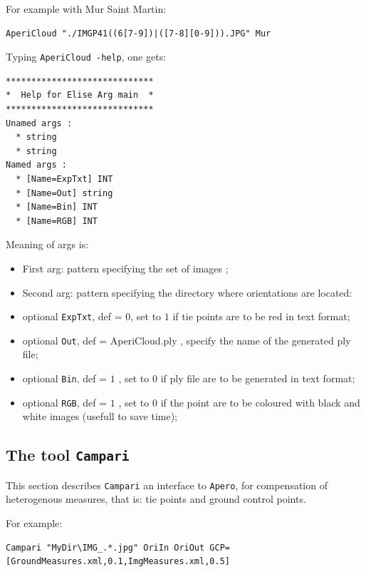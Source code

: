 For example with Mur Saint Martin:

\begin{verbatim}
AperiCloud "./IMGP41((6[7-9])|([7-8][0-9])).JPG" Mur
\end{verbatim}


Typing {\tt AperiCloud -help}, one gets:

\begin{verbatim}
*****************************
*  Help for Elise Arg main  *
*****************************
Unamed args : 
  * string
  * string
Named args : 
  * [Name=ExpTxt] INT
  * [Name=Out] string
  * [Name=Bin] INT
  * [Name=RGB] INT
\end{verbatim}

Meaning of args is:

\begin{itemize}
   \item First arg: pattern specifying the set of images ;
   \item Second  arg: pattern specifying the directory where orientations are located:
   \item optional {\tt ExpTxt}, def = $0$, set to $1$ if tie points are to be red in text format;
   \item optional {\tt Out}, def = AperiCloud.ply , specify the name of the generated ply file;
   \item optional {\tt Bin}, def = $1$ , set to  $0$  if ply file are to be generated in text format;
   \item optional {\tt RGB}, def = $1$ , set to  $0$  if the point are to be coloured with black
          and white images (usefull to save time);
\end{itemize}


\subsection{The tool {\tt Campari}}
\label{CAMPARI}

This section describes {\tt Campari} an interface to {\tt Apero}, for compensation 
of heterogenous measures, that is: tie points and ground control points.

\vspace{\baselineskip}
For example:

\begin{verbatim}
Campari "MyDir\IMG_.*.jpg" OriIn OriOut GCP=[GroundMeasures.xml,0.1,ImgMeasures.xml,0.5]
\end{verbatim}

